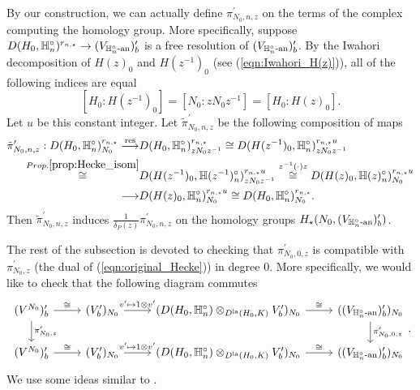 \documentclass[10pt]{amsart}
\begin{document}
\begin{remark}\label{rmk: Hecke_on_terms}
By our construction, we can actually define $\pi_{N_{0},n,z}^{\prime}$ on the terms of the complex computing the homology group. More specifically, suppose $D(H_{0},\mathbb{H}_{n}^{\circ})^{r_{n,\star}}\rightarrow (V_{\mathbb{H}_{n}^{\circ}\textnormal{-an}})^{\prime}_{b}$ is a free resolution of $(V_{\mathbb{H}_{n}^{\circ}\textnormal{-an}})^{\prime}_{b}$. By the Iwahori decomposition of $H(z)_{0}$ and $H(z^{-1})_{0}$ (see (\ref{eqn:Iwahori_H(z)})), all of the following indices are equal \[
    \left[H_{0}:H(z^{-1})_{0}\right] = \left[N_{0}:zN_{0}z^{-1}\right] = \left[H_{0}:H(z)_{0}\right].
\] Let $u$ be this constant integer. Let $\tilde{\pi}_{N_{0},n,z}^{\prime}$ be the following composition of maps \begin{equation}\begin{split}
    \tilde{\pi}_{N_{0},n,z}^{\prime}: D(H_{0},\mathbb{H}_{n}^{\circ})^{r_{n,\star}}_{N_{0}} \overset{\textnormal{res}}{\longrightarrow} & D(H_{0},\mathbb{H}_{n}^{\circ})^{r_{n,\star}}_{zN_{0}z^{-1}} \overset{}{\cong} D(H(z^{-1})_{0},\mathbb{H}_{n}^{\circ})^{r_{n,\star} u}_{zN_{0}z^{-1}} \\
    \overset{Prop. \ref{prop:Hecke_isom}}{\cong} & D(H(z^{-1})_{0},\mathbb{H}(z^{-1})_{n}^{\circ})^{r_{n,\star} u}_{zN_{0}z^{-1}} \overset{z^{-1}(\cdot)z}{\cong} D(H(z)_{0},\mathbb{H}(z)_{n}^{\circ})^{r_{n,\star} u}_{N_{0}} \\
    \overset{}{\longrightarrow} & D(H(z)_{0},\mathbb{H}_{n}^{\circ})^{r_{n,\star} u}_{N_{0}} \overset{}{\cong} D(H_{0},\mathbb{H}_{n}^{\circ})^{r_{n,\star}}_{N_{0}}.
\end{split}\end{equation} Then $\tilde{\pi}_{N_{0},n,z}^{\prime}$ induces $\frac{1}{\delta_{P}(z)}\pi_{N_{0},n,z}^{\prime}$ on the homology groups $H_{\star}(N_{0},(V_{\mathbb{H}_{n}^{\circ}\textnormal{-an}})^{\prime}_{b})$. 
\end{remark}

The rest of the subsection is devoted to checking that $\pi_{N_{0},0,z}^{\prime}$ is compatible with $\pi_{N_{0},z}^{\prime}$ (the dual of (\ref{eqn:original_Hecke})) in degree 0. More specifically, we would like to check that the following diagram commutes \begin{equation}\label{diag: Hecke_compatibility1}
\begin{tikzcd}
    (V^{N_{0}})^{\prime}_{b} \arrow[r,"\cong"] \arrow[d,"\pi_{N_{0},z}^{\prime}"] & (V^{\prime}_{b})_{N_{0}} \arrow[r,"v^{\prime}\map 1 \otimes v^{\prime}"] & (\dn \otimes_{D^{\La}(H_{0},K)} V^{\prime}_{b})_{N_{0}} \arrow[r,"\cong"] & (\vn)_{N_{0}} \arrow[d,"\pi_{N_{0},0,z}^{\prime}"] \\
    (V^{N_{0}})^{\prime}_{b} \arrow[r,"\cong"] & (V^{\prime}_{b})_{N_{0}} \arrow[r,"v^{\prime}\map 1 \otimes v^{\prime}"] & (\dn \otimes_{D^{\La}(H_{0},K)} V^{\prime}_{b})_{N_{0}} \arrow[r,"\cong"] & (\vn)_{N_{0}}
\end{tikzcd}. 
\end{equation} We use some ideas similar to \cite[Lem. 4.2.19, Lem. 4.2.21]{analytic}.  
\end{document}
